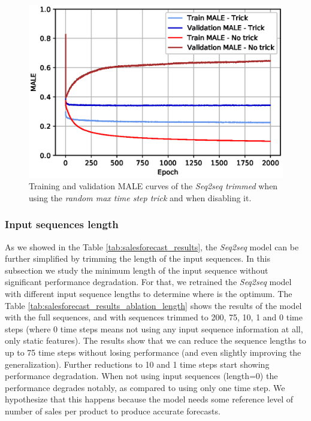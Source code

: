\begin{figure}[h!]
	\centering
	\includegraphics[width=0.7\linewidth]{salesforecast/images/train_curves_notrick}
	\caption{Training and validation MALE curves of the \textit{Seq2seq trimmed} when using the \textit{random max time step trick} and when disabling it.}
	\label{fig:traincurvesnotrick}
\end{figure}

\subsubsection{Input sequences length}
As we showed in the Table \ref{tab:salesforecast_results}, the \textit{Seq2seq} model can be further simplified by trimming the length of the input sequences. In this subsection we study the minimum length of the input sequence without significant performance degradation. For that, we retrained the \textit{Seq2seq} model with different input sequence lengths to determine where is the optimum. The Table 		\ref{tab:salesforecast_results_ablation_length} shows the results of the model with the full sequences, and with sequences trimmed to 200, 75, 10, 1 and 0 time steps (where 0 time steps means not using any input sequence information at all, only static features). The results show that we can reduce the sequence lengths to up to 75 time steps without losing performance (and even slightly improving the generalization). Further reductions to 10 and 1 time steps start showing performance degradation. When not using input sequences (length=0) the performance degrades notably, as compared to using only one time step. We hypothesize that this happens because the model needs some reference level of number of sales per product to produce accurate forecasts.

